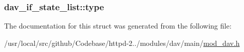 \subsubsection[{\texorpdfstring{type}{type}}]{ dav\+\_\+if\+\_\+state\+\_\+list\+::type}\hypertarget{structdav__if__state__list_adbad3b21c38d6af7f44a7473ba354189}{}\label{structdav__if__state__list_adbad3b21c38d6af7f44a7473ba354189}


The documentation for this struct was generated from the following file\+:\begin{DoxyCompactItemize}
\item 
/usr/local/src/github/\+Codebase/httpd-\/2../modules/dav/main/\hyperlink{mod__dav_8h}{mod\+\_\+dav.\+h}\end{DoxyCompactItemize}
